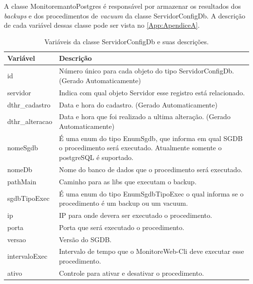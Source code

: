A classe MonitoremantoPostgres é responsável por armazenar os resultados dos \textit{backups} e dos procedimentos de \textit{vacuum} da classe ServidorConfigDb. A descrição de cada variável dessas classe pode ser vista no \autoref{App:ApendiceA}.

\begin{table}[H]
\centering
\begin{tabular}{|l|l|}
\hline
{\color[HTML]{000000} \textbf{Variável}} & {\color[HTML]{000000} \textbf{Descrição}}\\ \hline
id                                       & \multicolumn{1}{p{12.50cm}|}{Número único para cada objeto do tipo ServidorConfigDb. (Gerado Automaticamente) }\\ \hline
servidor                                 & \multicolumn{1}{p{12.50cm}|}{Indica com qual objeto Servidor esse registro está relacionado.}\\ \hline
dthr\_cadastro                           & \multicolumn{1}{p{12.50cm}|}{Data e hora do cadastro. (Gerado Automaticamente) } \\ \hline
dthr\_alteracao                          & \multicolumn{1}{p{12.50cm}|}{Data e hora que foi realizado a ultima alteração. (Gerado Automaticamente)}\\ \hline
nomeSgdb                                 & \multicolumn{1}{p{12.50cm}|}{É uma enum do tipo EnumSgdb, que informa em qual SGDB o procedimento será executado. Atualmente somente o postgreSQL é suportado. }\\ \hline
nomeDb                                   & \multicolumn{1}{p{12.50cm}|}{Nome do banco de dados que o procedimento será executado.}\\ \hline
pathMain                                 & \multicolumn{1}{p{12.50cm}|}{Caminho para as libs que executam o backup.}\\ \hline
sgdbTipoExec                             & \multicolumn{1}{p{12.50cm}|}{É uma enum do tipo EnumSgdbTipoExec o qual informa se o procedimento é um backup ou um vacuum.} \\ \hline
ip                                       & \multicolumn{1}{p{12.50cm}|}{IP para onde devera ser executado o procedimento. }\\ \hline
porta                                    & \multicolumn{1}{p{12.50cm}|}{Porta que será executado o procedimento. }\\ \hline
versao                                   & \multicolumn{1}{p{12.50cm}|}{Versão do SGDB.}\\ \hline
intervaloExec                            & \multicolumn{1}{p{12.50cm}|}{Intervalo de tempo que o MonitoreWeb-Cli deve executar esse procedimento.}\\ \hline
ativo                                    & \multicolumn{1}{p{12.50cm}|}{Controle para ativar e desativar o procedimento.}\\ \hline
\end{tabular}
\caption[Variáveis da classe ServidorConfigDb e suas descrições.]{Variáveis da classe ServidorConfigDb e suas descrições.}
\label{Tab:VariaveisServidorConfigDb}
\end{table}

